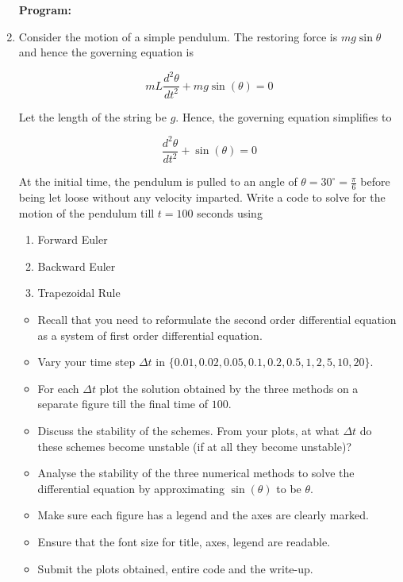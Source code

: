 \documentclass[a4paper,11pt]{report}
\begin{document}
\begin{enumerate}
    \textbf{Program:}
    

    \begin{figure}[ht!]
    \centering
    \resizebox{0.9\linewidth}{!}{}
    \end{figure}

    \item Consider the motion of a simple pendulum. The restoring force is $mg \sin \theta$
    and hence the governing equation is

    \begin{equation*}
    mL \frac{d^{2} \theta}{dt^{2}} + mg \sin(\theta) = 0
    \end{equation*}

    Let the length of the string be $g$. Hence, the governing equation simplifies to
                    
    \begin{equation*}
    \frac{d^{2} \theta}{dt^{2}} + \sin(\theta) = 0
    \end{equation*}

    At the initial time, the pendulum is pulled to an angle of $\theta = 30^{\circ} =
    \displaystyle \frac{\pi}{6}$
    before being let loose without any velocity imparted. Write a code to solve for the
    motion of the pendulum till $t = 100$ seconds using

    \begin{enumerate}
    \item Forward Euler
    \item Backward Euler
    \item Trapezoidal Rule
    \end{enumerate}

    \begin{itemize}
    \item Recall that you need to reformulate the second order differential equation as a
    system of first order differential equation.
    \item Vary your time step $\Delta t$ in $\{0.01, 0.02, 0.05, 0.1, 0.2, 0.5, 1, 2, 5,
    10, 20\}$.
    \item For each $\Delta t$ plot the solution obtained by the three methods on a separate
    figure till the final time of $100$.
    \item Discuss the stability of the schemes. From your plots, at what $\Delta t$ do these
    schemes become unstable (if at all they become unstable)?
    \item Analyse the stability of the three numerical methods to solve the differential
    equation by approximating $\sin(\theta)$ to be $\theta$.
    \item Make sure each figure has a legend and the axes are clearly marked.
    \item Ensure that the font size for title, axes, legend are readable.
    \item Submit the plots obtained, entire code and the write-up.
    \end{itemize}



\end{enumerate}
\end{document}

